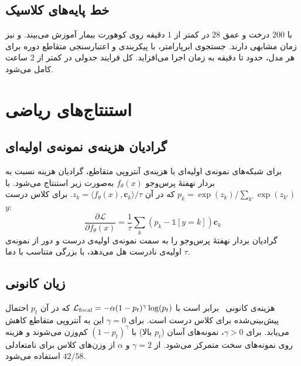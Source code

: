 \subsection{خط پایه‌های کلاسیک}

 با $200$ درخت و عمق $28$ در کمتر از $1$ دقیقه روی کوهورت  بیمار آموزش می‌بیند.  و  نیز زمان مشابهی دارند. جستجوی ابرپارامتر، با  پیکربندی و اعتبارسنجی متقاطع دوره برای هر مدل، حدود  تا  دقیقه به زمان اجرا می‌افزاید. کل فرایند  جدولی در کمتر از $2$ ساعت کامل می‌شود.

\section{استنتاج‌های ریاضی}

\subsection{گرادیان هزینه‌ی نمونه‌ی اولیه‌ای}

برای شبکه‌های نمونه‌ی اولیه‌ای با هزینه‌ی آنتروپی متقاطع، گرادیان هزینه نسبت به بردار نهفتۀ پرس‌وجو $f_\theta(x)$ به‌صورت زیر استنتاج می‌شود. با $p_k = \exp(z_k) / \sum_{k'} \exp(z_{k'})$ که در آن $z_k = \langle f_\theta(x), \mathbf{c}_k \rangle / \tau$. برای کلاس درست $y$:
\begin{equation}
\frac{\partial \mathcal{L}}{\partial f_\theta(x)} = \frac{1}{\tau} \sum_k (p_k - \mathbb{1}[y=k]) \mathbf{c}_k
\end{equation}
گرادیان بردار نهفتۀ پرس‌وجو را به سمت نمونه‌ی اولیه‌ی درست و دور از نمونه‌ی اولیه‌ی نادرست هل می‌دهد، با بزرگی متناسب با دما $\tau$.

\subsection{زیان کانونی}

هزینه‌ی کانونی~\cite{lin2017focal} برابر است با $\mathcal{L}_{\text{focal}} = -\alpha (1-p_t)^\gamma \log(p_t)$ که در آن $p_t$ احتمال پیش‌بینی‌شده برای کلاس درست است. برای $\gamma = 0$ این به آنتروپی متقاطع کاهش می‌یابد. برای $\gamma > 0$، نمونه‌های آسان ($p_t$ بالا) با $(1-p_t)^\gamma$ کم‌وزن می‌شوند و هزینه روی نمونه‌های سخت متمرکز می‌شود. از $\gamma = 2$ و $\alpha$ از وزن‌های کلاس برای نامتعادلی $42/58$ استفاده می‌شود.

